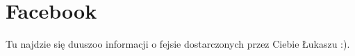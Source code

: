 \section{Facebook}
\label{sec:facebook}
Tu najdzie się duuszoo informacji o fejsie dostarczonych przez Ciebie Łukaszu :).

